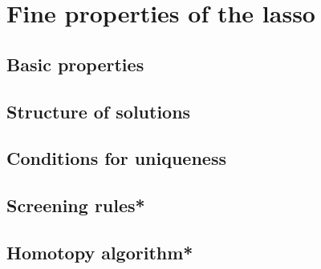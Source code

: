 \chapter{Fine properties of the lasso}
\label{chap:lasso}


\section{Basic properties}

\section{Structure of solutions}
\label{sec:lasso_structure}


\section{Conditions for uniqueness}

\section{Screening rules*}

\section{Homotopy algorithm*}

